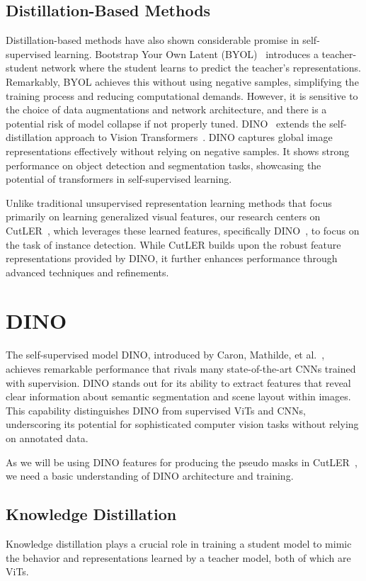 \subsection{Distillation-Based Methods}
Distillation-based methods have also shown considerable promise in self-supervised learning. Bootstrap Your Own Latent (BYOL)~\cite{grill2020bootstrap} introduces a teacher-student network where the student learns to predict the teacher's representations. Remarkably, BYOL achieves this without using negative samples, simplifying the training process and reducing computational demands. However, it is sensitive to the choice of data augmentations and network architecture, and there is a potential risk of model collapse if not properly tuned. DINO~\cite{caron2021emerging} extends the self-distillation approach to Vision Transformers~\cite{dosovitskiy2020image}. DINO captures global image representations effectively without relying on negative samples. It shows strong performance on object detection and segmentation tasks, showcasing the potential of transformers in self-supervised learning.

Unlike traditional unsupervised representation learning methods that focus primarily on learning generalized visual features, our research centers on CutLER~\cite{wang2023cut}, which leverages these learned features, specifically DINO~\cite{caron2021emerging}, to focus on the task of instance detection. While CutLER builds upon the robust feature representations provided by DINO, it further enhances performance through advanced techniques and refinements.

\section{DINO}
The self-supervised model DINO, introduced by Caron, Mathilde, et al.~\cite{caron2021emerging}, achieves remarkable performance that rivals many state-of-the-art CNNs trained with supervision. DINO stands out for its ability to extract features that reveal clear information about semantic segmentation and scene layout within images. This capability distinguishes DINO from supervised ViTs and CNNs, underscoring its potential for sophisticated computer vision tasks without relying on annotated data.

As we will be using DINO features for producing the pseudo masks in CutLER~\cite{wang2023cut}, we need a basic understanding of DINO architecture and training.

\subsection{Knowledge Distillation}
 Knowledge distillation plays a crucial role in training a student model to mimic the behavior and representations learned by a teacher model, both of which are ViTs. 
 

